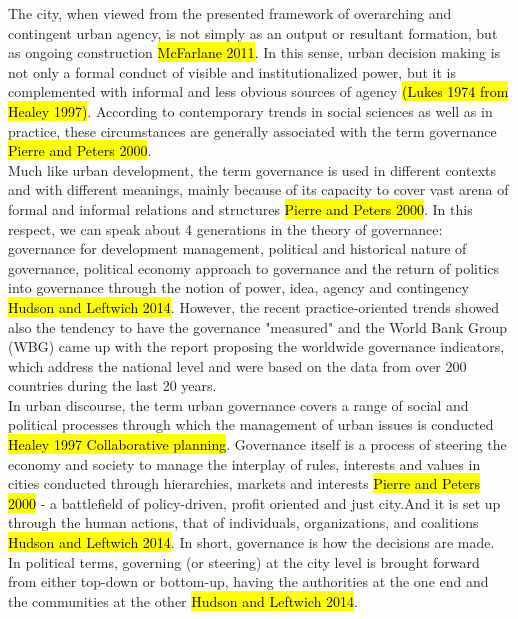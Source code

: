 \documentclass[11pt]{report}
\begin{document}
The city, when viewed from the presented framework of overarching and contingent urban agency, is not simply as an output or resultant formation,  but  as  ongoing  construction \hl{McFarlane 2011}.
In this sense, urban decision making is not only a formal conduct of visible and institutionalized power, but it is  complemented with informal and less obvious sources of agency \hl{(Lukes 1974 from Healey 1997)}.
According to contemporary trends in social sciences as well as in practice, these circumstances are generally associated with the term governance \hl{Pierre and Peters 2000}.
\\
Much like urban development, the term governance is used in different contexts and with different meanings, mainly because of its capacity to cover vast arena of formal and informal relations and structures \hl{Pierre and Peters 2000}.
In this respect, we can speak about 4 generations in the theory of governance: governance for development management, political and historical nature of governance, political economy approach to governance and the return of politics into governance through the notion of power, idea, agency and contingency \hl{Hudson and Leftwich 2014}.
However, the recent practice-oriented trends showed also the tendency to have the governance "measured" and the World Bank Group (WBG) came up with the report proposing the worldwide governance indicators, which address the national level and were based on the data from over 200 countries during the last 20 years.\footnotemark
{}
\\
In urban discourse, the term urban governance covers a range of social and political processes through which the management of urban issues is conducted \hl{Healey 1997 Collaborative planning}.
Governance itself is a process of steering the economy and society to manage the interplay of rules, interests and values in cities conducted through hierarchies, markets and interests \hl{Pierre and Peters 2000} - a battlefield of policy-driven, profit oriented and just city.\footnotemark And it is set up through the human actions, that of individuals, organizations, and coalitions \hl{Hudson and Leftwich 2014}.
In short, governance is how the decisions are made.
\\
In political terms, governing (or steering) at the city level is brought forward from either top-down or bottom-up, having the authorities at the one end and the communities at the other \hl{Hudson and Leftwich 2014}.
\end{document}

